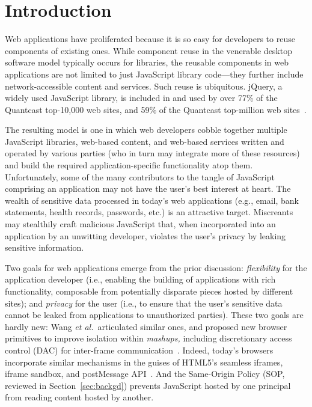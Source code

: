 \section{Introduction}
\label{sec:intro}

Web applications have proliferated because it is so easy for
developers to reuse components of existing ones. While component reuse
in the venerable desktop software model typically occurs for libraries,
the reusable components in web applications are not limited to just
JavaScript library code---they further include network-accessible
content and services. Such reuse is ubiquitous\@. jQuery, a widely used
JavaScript library, is included in and used by over 77\% of the
Quantcast top-10,000 web sites, and 59\% of the Quantcast top-million
web sites~\cite{quantcast}.

The resulting model is one in which web developers cobble together
multiple JavaScript libraries, web-based content, and web-based
services written and operated by various parties (who in turn may
integrate more of these resources) and build the required
application-specific functionality atop them. Unfortunately, some of
the many contributors to the tangle of JavaScript comprising an
application may not have the user's best interest at heart. The wealth
of sensitive data processed in today's web applications (e.g., email,
bank statements, health records, passwords, etc.) is an attractive
target. Miscreants may stealthily craft malicious JavaScript that,
when incorporated into an application by an unwitting developer,
violates the user's privacy by leaking sensitive information.

Two goals for web applications emerge from the prior discussion:
\emph{flexibility} for the application developer (i.e., enabling the
building of applications with rich functionality, composable from
potentially disparate pieces hosted by different sites); and
\emph{privacy} for the user (i.e., to ensure that the user's sensitive
data cannot be leaked from applications to unauthorized parties).
These two goals are hardly new: Wang {\em et al.}~articulated similar
ones, and proposed new browser primitives to improve isolation within
{\em mashups,} including discretionary access control (DAC) for inter-frame
communication~\cite{mashupos}. Indeed, today's browsers incorporate
similar mechanisms in the guises of HTML5's seamless iframes, iframe
sandbox, and postMessage API~\cite{html5}. And the Same-Origin Policy
(SOP, reviewed in Section~\ref{sec:backgd}) prevents JavaScript hosted
by one principal from reading content hosted by another.

